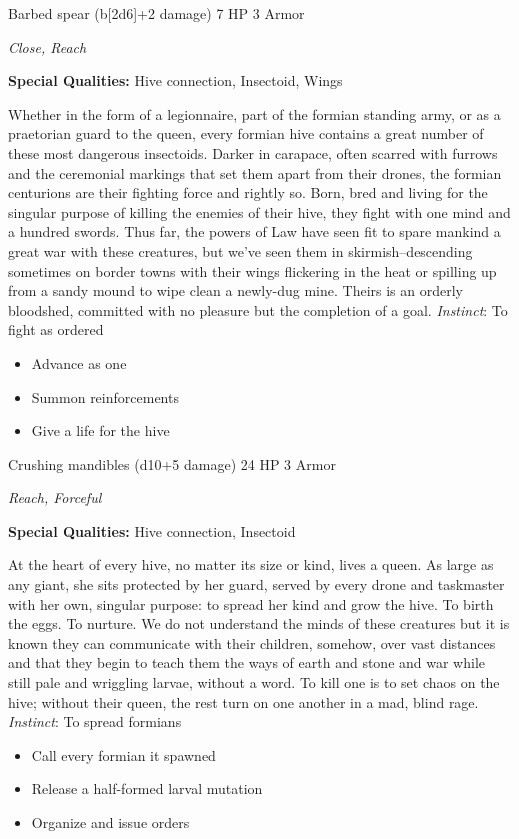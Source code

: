 Barbed spear (b[2d6]+2 damage)\hspace*{\fill} 7 HP 3 Armor

\emph{Close, Reach}

\textbf{Special Qualities:}
Hive connection, Insectoid, Wings

\HRule
Whether in the form of a legionnaire, part of the formian standing army, or as a praetorian guard to the queen, every formian hive contains a great number of these most dangerous insectoids. Darker in carapace, often scarred with furrows and the ceremonial markings that set them apart from their drones, the formian centurions are their fighting force and rightly so. Born, bred and living for the singular purpose of killing the enemies of their hive, they fight with one mind and a hundred swords. Thus far, the powers of Law have seen fit to spare mankind a great war with these creatures, but we've seen them in skirmish--descending sometimes on border towns with their wings flickering in the heat or spilling up from a sandy mound to wipe clean a newly-dug mine. Theirs is an orderly bloodshed, committed with no pleasure but the completion of a goal. \emph{Instinct}: To fight as ordered
\begin{itemize}
\item Advance as one
\item Summon reinforcements
\item Give a life for the hive
\end{itemize}
\newpage
\HRule
{}

Crushing mandibles (d10+5 damage)\hspace*{\fill} 24 HP 3 Armor

\emph{Reach, Forceful}

\textbf{Special Qualities:}
Hive connection, Insectoid

\HRule
At the heart of every hive, no matter its size or kind, lives a queen. As large as any giant, she sits protected by her guard, served by every drone and taskmaster with her own, singular purpose: to spread her kind and grow the hive. To birth the eggs. To nurture. We do not understand the minds of these creatures but it is known they can communicate with their children, somehow, over vast distances and that they begin to teach them the ways of earth and stone and war while still pale and wriggling larvae, without a word. To kill one is to set chaos on the hive; without their queen, the rest turn on one another in a mad, blind rage. \emph{Instinct}: To spread formians
\begin{itemize}
\item Call every formian it spawned
\item Release a half-formed larval mutation
\item Organize and issue orders
\end{itemize}
\newpage
\HRule
{}

